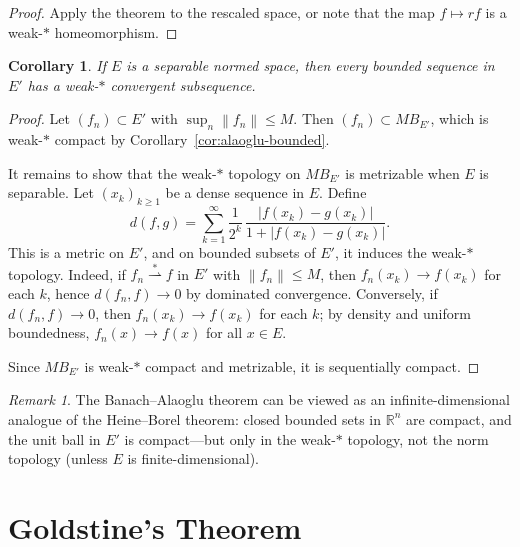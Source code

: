 \documentclass[a4paper,12pt]{book}
\newcommand{\R}{\mathbb{R}}
\newcommand{\norm}[1]{\left\| #1 \right\|}
\newcommand{\weakstarto}{\overset{*}{\rightharpoonup}}
\theoremstyle{definition}
\theoremstyle{plain}
\newtheorem{corollary}[definition]{Corollary}
\theoremstyle{remark}
\newtheorem{remark}[definition]{Remark}
\begin{document}
\begin{proof}
Apply the theorem to the rescaled space, or note that the map $f\mapsto rf$
is a weak-$*$ homeomorphism.
\end{proof}

\begin{corollary}\label{cor:weak-star-subsequence}
If $E$ is a separable normed space, then every bounded sequence in $E'$ has
a weak-$*$ convergent subsequence.
\end{corollary}

\begin{proof}
Let $(f_n)\subset E'$ with $\sup_n\norm{f_n}\le M$.  Then $(f_n)\subset MB_{E'}$,
which is weak-$*$ compact by Corollary~\ref{cor:alaoglu-bounded}.

It remains to show that the weak-$*$ topology on $MB_{E'}$ is metrizable
when $E$ is separable.  Let $(x_k)_{k\ge 1}$ be a dense sequence in $E$.
Define
\[
  d(f,g) = \sum_{k=1}^\infty \frac{1}{2^k}\,
  \frac{|f(x_k)-g(x_k)|}{1+|f(x_k)-g(x_k)|}.
\]
This is a metric on $E'$, and on bounded subsets of $E'$, it induces the
weak-$*$ topology.
Indeed, if $f_n\weakstarto f$ in $E'$ with $\norm{f_n}\le M$, then
$f_n(x_k)\to f(x_k)$ for each $k$, hence $d(f_n,f)\to 0$ by dominated
convergence.  Conversely, if $d(f_n,f)\to 0$, then $f_n(x_k)\to f(x_k)$
for each $k$; by density and uniform boundedness, $f_n(x)\to f(x)$ for all
$x\in E$.

Since $MB_{E'}$ is weak-$*$ compact and metrizable, it is sequentially compact.
\end{proof}

\begin{remark}\label{rem:alaoglu-vs-heine-borel}
The Banach--Alaoglu theorem can be viewed as an infinite-dimensional analogue of
the Heine--Borel theorem: closed bounded sets in $\R^n$ are compact, and the
unit ball in $E'$ is compact---but only in the weak-$*$ topology, not the
norm topology (unless $E$ is finite-dimensional).
\end{remark}

\section{Goldstine's Theorem}\label{sec:goldstine}
\end{document}
